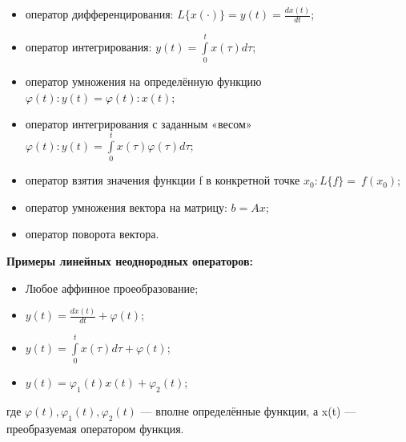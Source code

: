 \begin{itemize}
\item оператор дифференцирования: $L\{x(\cdot)\} = y(t) = \frac {dx(t)} {dt}$;
\item оператор интегрирования: $y(t) = \int\limits_0^t x(\tau)d\tau$;
\item оператор умножения на определённую функцию $\varphi(t)\colon y(t) =  \varphi(t)\colon x(t)$;
\item оператор интегрирования с заданным «весом» $\varphi(t)\colon y(t) =  \int\limits_0^t x(\tau)\varphi(\tau)d\tau$;
\item оператор взятия значения функции f в конкретной точке $x_0: L\{f\} = ~f(x_0)$;
\item оператор умножения вектора на матрицу: $ b = Ax$;
\item оператор поворота вектора.
\end{itemize}
{\large{\bf Примеры линейных неоднородных операторов:}}


\begin{itemize}
\item Любое аффинное проеобразование;
\item $y(t) = \frac {dx(t)} {dt} + \varphi(t)$;
\item $y(t) = \int\limits_0^t x(\tau)d\tau+\varphi(t)$;
\item $y(t) = \varphi_1(t)x(t)+\varphi_2(t)$;
\end{itemize}
где $ \varphi(t), \varphi_1(t), \varphi_2(t)$ --- вполне определённые функции, а x(t) --- преобразуемая оператором функция.

